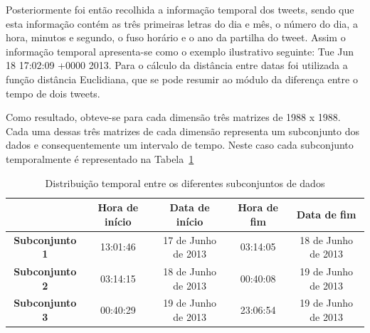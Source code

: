 Posteriormente foi então recolhida a informação temporal dos tweets, sendo que esta informação contém as três primeiras letras do dia e mês, o número do dia, a hora, minutos e segundo, o fuso horário e o ano da partilha do tweet. Assim o informação temporal apresenta-se como o exemplo ilustrativo seguinte: Tue Jun 18 17:02:09 +0000 2013. Para o cálculo da distância entre datas foi utilizada a função distância Euclidiana, que se pode resumir ao módulo da diferença entre o tempo de dois tweets.

Como resultado, obteve-se para cada dimensão três matrizes de 1988 x 1988. Cada uma dessas três matrizes de cada dimensão representa um subconjunto dos dados e consequentemente um intervalo de tempo. Neste caso cada subconjunto temporalmente é representado na Tabela~\ref{tab:distemp}

\begin{table}[h]
\centering
\begin{tabular}{|c|c|c|c|c|}
\hline
\textbf{}              & Hora de início & Data de início      & Hora de fim & Data de fim         \\ \hline
\textbf{Subconjunto 1} & 13:01:46       & 17 de Junho de 2013 & 03:14:05    & 18 de Junho de 2013 \\ \hline
\textbf{Subconjunto 2} & 03:14:15       & 18 de Junho de 2013 & 00:40:08    & 19 de Junho de 2013 \\ \hline
\textbf{Subconjunto 3} & 00:40:29       & 19 de Junho de 2013 & 23:06:54    & 19 de Junho de 2013 \\ \hline
\end{tabular}
\caption{Distribuição temporal entre os diferentes subconjuntos de dados}
\label{tab:distemp}
\end{table}

%
%

